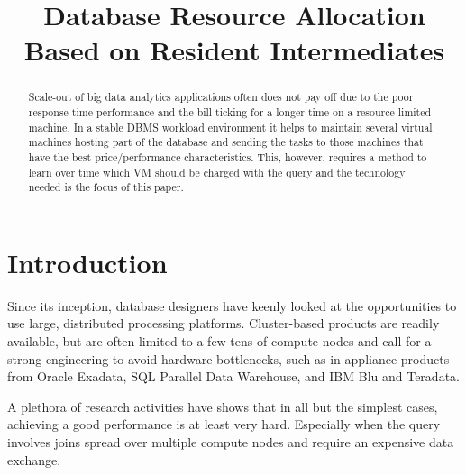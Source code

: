 \documentclass[conference]{IEEEtran}
\begin{document}
\title{Database Resource Allocation Based on Resident Intermediates}

\author{
}

\maketitle

\begin{abstract} 
Scale-out of big data analytics applications often does not pay off due to the poor response time performance and the bill ticking for a longer time on a resource limited machine.
In a stable DBMS workload environment it helps to maintain several virtual machines hosting
part of the database and sending the tasks to those machines that have the best price/performance characteristics.
This, however, requires a method to learn over time which VM should be charged with the
query and the technology needed is the focus of this paper.
\end{abstract} 

\section{Introduction}
\label{Introduction} 
Since its inception, database designers have keenly looked at the opportunities to use large, distributed processing platforms. Cluster-based products are readily available, but are often limited to a few tens of compute nodes and call for a strong engineering to avoid hardware bottlenecks, such as in appliance products from Oracle Exadata, SQL Parallel Data Warehouse, and IBM Blu and Teradata.

A plethora of research activities have shows that in all but the simplest cases, achieving a good performance is at least very hard. Especially when the query involves joins spread over multiple compute nodes and require an expensive data exchange. 
\end{document}

